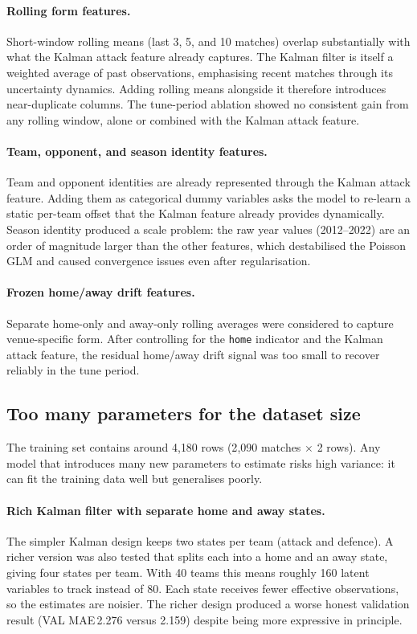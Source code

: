 \documentclass[11pt]{article}
\begin{document}
\paragraph{Rolling form features.}
Short-window rolling means (last 3, 5, and 10 matches) overlap substantially
with what the Kalman attack feature already captures. The Kalman filter is
itself a weighted average of past observations, emphasising recent matches
through its uncertainty dynamics. Adding rolling means alongside it therefore
introduces near-duplicate columns. The tune-period ablation showed no
consistent gain from any rolling window, alone or combined with the Kalman
attack feature.

\paragraph{Team, opponent, and season identity features.}
Team and opponent identities are already represented through the Kalman attack
feature. Adding them as categorical dummy variables asks the model to re-learn
a static per-team offset that the Kalman feature already provides dynamically.
Season identity produced a scale problem: the raw year values (2012--2022) are
an order of magnitude larger than the other features, which destabilised the
Poisson GLM and caused convergence issues even after regularisation.

\paragraph{Frozen home/away drift features.}
Separate home-only and away-only rolling averages were considered to capture
venue-specific form. After controlling for the \texttt{home} indicator and
the Kalman attack feature, the residual home/away drift signal was too small
to recover reliably in the tune period.

\subsection{Too many parameters for the dataset size}

The training set contains around 4{,}180 rows (2{,}090 matches $\times$ 2
rows). Any model that introduces many new parameters to estimate risks high
variance: it can fit the training data well but generalises poorly.

\paragraph{Rich Kalman filter with separate home and away states.}
The simpler Kalman design keeps two states per team (attack and defence).
A richer version was also tested that splits each into a home and an away
state, giving four states per team. With 40 teams this means roughly 160
latent variables to track instead of 80. Each state receives fewer effective
observations, so the estimates are noisier. The richer design produced a
worse honest validation result (VAL MAE\,2.276 versus 2.159) despite being
more expressive in principle.
\end{document}
